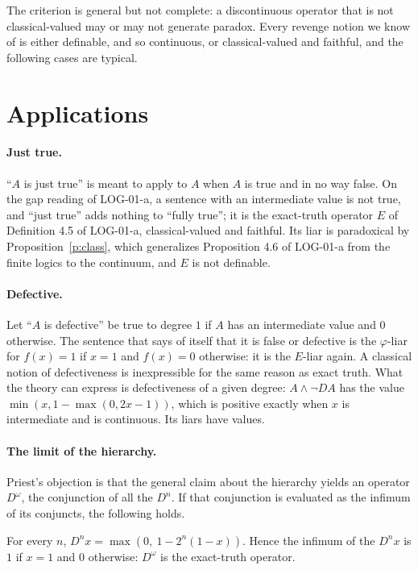 \documentclass{situationist-preprint}
\begin{document}
The criterion is general but not complete: a discontinuous operator that is not classical-valued may or may not generate paradox. Every revenge notion we know of is either definable, and so continuous, or classical-valued and faithful, and the following cases are typical.

\section{Applications}

\paragraph{Just true.} \enquote{$A$ is just true} is meant to apply to $A$ when $A$ is true and in no way false. On the gap reading of LOG-01-a, a sentence with an intermediate value is not true, and \enquote{just true} adds nothing to \enquote{fully true}; it is the exact-truth operator $E$ of Definition 4.5 of LOG-01-a, classical-valued and faithful. Its liar is paradoxical by Proposition~\ref{p:class}, which generalizes Proposition 4.6 of LOG-01-a from the finite logics to the continuum, and $E$ is not definable.

\paragraph{Defective.} Let \enquote{$A$ is defective} be true to degree $1$ if $A$ has an intermediate value and $0$ otherwise. The sentence that says of itself that it is false or defective is the $\varphi$-liar for $f(x) = 1$ if $x = 1$ and $f(x) = 0$ otherwise: it is the $E$-liar again. A classical notion of defectiveness is inexpressible for the same reason as exact truth. What the theory can express is defectiveness of a given degree: $A \wedge \neg D A$ has the value $\min(x, 1 - \max(0, 2x - 1))$, which is positive exactly when $x$ is intermediate and is continuous. Its liars have values.

\paragraph{The limit of the hierarchy.} Priest's objection is that the general claim about the hierarchy yields an operator $D^\omega$, the conjunction of all the $D^n$. If that conjunction is evaluated as the infimum of its conjuncts, the following holds.

\begin{proposition}\label{p:limit}
For every $n$, $D^n x = \max(0,\ 1 - 2^n(1 - x))$. Hence the infimum of the $D^n x$ is $1$ if $x = 1$ and $0$ otherwise: $D^\omega$ is the exact-truth operator.
\end{proposition}
\end{document}
